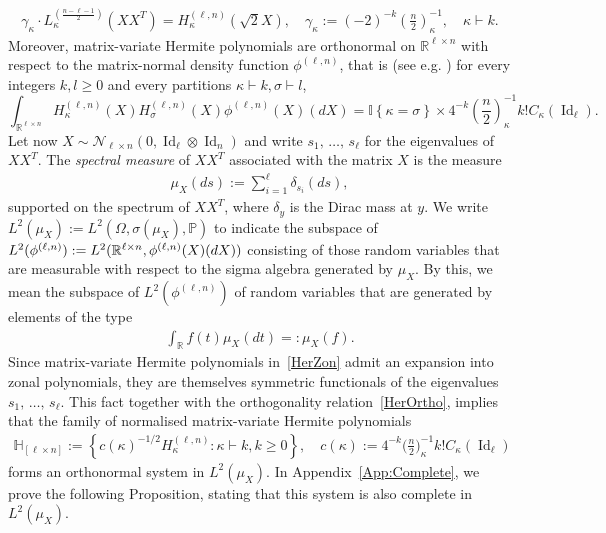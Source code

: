 \documentclass[10pt]{amsart}
\theoremstyle{definition}\newtheorem{defi}[theo]{Definition}\newtheorem{rema}[theo]{Remark}\newtheorem{exam}[theo]{Example}\newtheorem{exem}[theo]{Example}\newtheorem{nota}[theo]{Notation}
\DeclareMathOperator{\Id}{Id}
\newcommand{\scN}{\mathscr{N}}
\newcommand{\R}{\mathbb{R}}
\newcommand{\bbH}{\mathbb{H}}
\newcommand{\Prob}{\mathbb{P}}
\newcommand{\ind}[1]{\mathbb{I}
\left\{#1\right\}}
\begin{document}
\begin{gather}\label{RelHerLag}
\gamma_{\kappa}\cdot L_{\kappa}^{\left(\frac{n-\ell-1}{2}\right)}\left(XX^T\right) = H^{(\ell,n)}_{\kappa}\left(\sqrt{2}X\right), \quad \gamma_{\kappa}:=(-2)^{-k} \left(\frac{n}{2}\right)_{\kappa}^{-1}, \quad \kappa \vdash k.
\end{gather}
Moreover, matrix-variate Hermite polynomials are orthonormal on $\R^{\ell \times n}$ with respect to the matrix-normal density function $\phi^{(\ell,n)}$, that is (see e.g. \cite[Corollary~3]{Hay}) for every integers $k,l\geq0$ and every partitions $\kappa \vdash k,\sigma \vdash l$,
\begin{equation}\label{HerOrtho}
\int_{\R^{\ell \times n}} H_{\kappa}^{(\ell,n)}(X) H_{\sigma}^{(\ell,n)}(X) \phi^{(\ell,n)}(X) (dX) = \ind{\kappa=\sigma} \times 4^{-k}\left(\frac{n}{2}\right)_{\kappa}^{-1} k !C_{\kappa}(\Id_{\ell}).
\end{equation}
Let now $X \sim \scN_{\ell \times n}(0,\Id_{\ell}\otimes\Id_n)$ and write $s_1,\,\ldots,\,s_{\ell}$ for the eigenvalues of\linebreak $XX^T$. The \emph{spectral measure} of $XX^T$ associated with the matrix $X$ is the measure
\begin{gather*}
\mu_X(ds):=\sum_{i =1}^{\ell} \delta_{s_i}(ds),
\end{gather*}
supported on the spectrum of $XX^T$, where $\delta_y$ is the Dirac mass at $y$. We write $L^2(\mu_X):=L^2(\Omega,\sigma(\mu_X),\Prob)$ to indicate the subspace of $L^2(\phi^{(\ell,n)}):=L^2(\R^{\ell \times n}, \phi^{(\ell,n)}\linebreak(X)(dX))$ consisting of those random variables that are measurable with respect to the sigma algebra generated by $\mu_X$. By this, we mean the subspace of $L^2(\phi^{(\ell,n)})$ of random variables that are generated by elements of the type
\begin{gather}\label{F}
\int_{\R } f(t) \mu_X(dt) =: \mu_X(f).
\end{gather}
Since matrix-variate Hermite polynomials in~\eqref{HerZon} admit an expansion into zonal polynomials, they are themselves symmetric functionals of the eigenvalues $s_1,\,\ldots,\, s_{\ell} $. This fact together with the orthogonality relation~\eqref{HerOrtho}, implies that the family of normalised matrix-variate Hermite polynomials
\begin{gather}\label{HerONB}
\bbH_{[\ell \times n]}:=\left\{ c(\kappa)^{-1/2} H_{\kappa}^{(\ell,n)} : \kappa \vdash k, k \geq 0 \right\}, \quad c(\kappa):=4^{-k}\bigg(\frac{n}{2}\bigg)_{\kappa}^{-1} k !C_{\kappa}(\Id_{\ell})
\end{gather}
forms an orthonormal system in $L^2(\mu_X)$. In Appendix~\ref{App:Complete}, we prove the following Proposition, stating that this system is also complete in $L^2(\mu_X)$.
\end{document}
